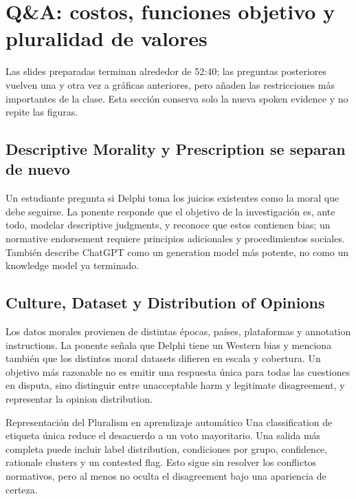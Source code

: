 \section{Q\&A: costos, funciones objetivo y pluralidad de valores}

Las slides preparadas terminan alrededor de 52:40; las preguntas posteriores vuelven una y otra vez a gráficas anteriores, pero añaden las restricciones más importantes de la clase. Esta sección conserva solo la nueva spoken evidence y no repite las figuras.

\subsection{Descriptive Morality y Prescription se separan de nuevo}

Un estudiante pregunta si Delphi toma los juicios existentes como la moral que debe seguirse. La ponente responde que el objetivo de la investigación es, ante todo, modelar descriptive judgments, y reconoce que estos contienen bias; un normative endorsement requiere principios adicionales y procedimientos sociales. También describe ChatGPT como un generation model más potente, no como un knowledge model ya terminado.


\subsection{Culture, Dataset y Distribution of Opinions}

Los datos morales provienen de distintas épocas, países, plataformas y annotation instructions. La ponente señala que Delphi tiene un Western bias y menciona también que los distintos moral datasets difieren en escala y cobertura. Un objetivo más razonable no es emitir una respuesta única para todas las cuestiones en disputa, sino distinguir entre unacceptable harm y legitimate disagreement, y representar la opinion distribution.

\begin{knowledgebox}{Representación del Pluralism en aprendizaje automático}
Una classification de etiqueta única reduce el desacuerdo a un voto mayoritario. Una salida más completa puede incluir label distribution, condiciones por grupo, confidence, rationale clusters y un contested flag. Esto sigue sin resolver los conflictos normativos, pero al menos no oculta el disagreement bajo una apariencia de certeza.
\end{knowledgebox}

